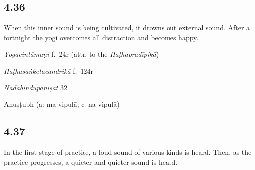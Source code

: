 \begin{ekdosis}
\subsection*{4.36}
\begin{translation}[hp04_036]
When this inner sound is being cultivated, it drowns out external sound. After a fortnight the yogi overcomes all distraction and becomes happy.
\end{translation}


\begin{testimonia}[hp04_036]
\emph{Yogacintāmaṇi} f.~24r (attr. to the \emph{Haṭhapradīpikā})
\begin{versinnote}
\end{versinnote}

\emph{Haṭhasaṅketacandrikā} f.~124r
\begin{versinnote}
\end{versinnote}

\emph{Nādabindūpaniṣat} 32
\begin{versinnote}
\end{versinnote}
\end{testimonia}


\begin{metre}[hp04_036]
Anuṣṭubh (a: ma-vipulā; c: na-vipulā)
\end{metre}

\subsection*{4.37}
\begin{translation}[hp04_037]
In the first stage of practice, a loud sound of various kinds is heard. Then, as the practice progresses, a quieter and quieter sound is heard.
\end{translation}


\end{ekdosis}
